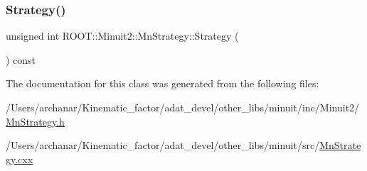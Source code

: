 \subsubsection{\texorpdfstring{Strategy()}{Strategy()}\hspace{0.1cm}{\footnotesize\ttfamily [2/2]}}
{\footnotesize\ttfamily unsigned int R\+O\+O\+T\+::\+Minuit2\+::\+Mn\+Strategy\+::\+Strategy (\begin{DoxyParamCaption}{ }\end{DoxyParamCaption}) const\hspace{0.3cm}{\ttfamily [inline]}}



The documentation for this class was generated from the following files\+:\begin{DoxyCompactItemize}
\item 
/\+Users/archanar/\+Kinematic\+\_\+factor/adat\+\_\+devel/other\+\_\+libs/minuit/inc/\+Minuit2/\mbox{\hyperlink{other__libs_2minuit_2inc_2Minuit2_2MnStrategy_8h}{Mn\+Strategy.\+h}}\item 
/\+Users/archanar/\+Kinematic\+\_\+factor/adat\+\_\+devel/other\+\_\+libs/minuit/src/\mbox{\hyperlink{MnStrategy_8cxx}{Mn\+Strategy.\+cxx}}\end{DoxyCompactItemize}
